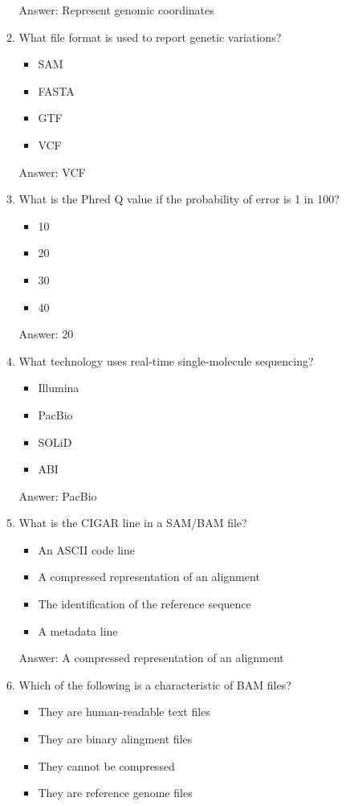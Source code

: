\begin{itemize}
\begin{enumerate}
Answer: Represent genomic coordinates

\item What file format is used to report genetic variations?
\begin{itemize}
\item SAM
\item FASTA
\item GTF
\item VCF
\end{itemize}

Answer: VCF

\item What is the Phred Q value if the probability of error is 1 in 100?
\begin{itemize}
\item 10
\item 20
\item 30
\item 40
\end{itemize}

Answer: 20

\item What technology uses real-time single-molecule sequencing?
\begin{itemize}
\item Illumina
\item PacBio
\item SOLiD
\item ABI
\end{itemize}

Answer: PacBio

\item What is the CIGAR line in a SAM/BAM file?
\begin{itemize}
\item An ASCII code line
\item A compressed representation of an alignment
\item The identification of the reference sequence
\item A metadata line
\end{itemize}

Answer: A compressed representation of an alignment

\item Which of the following is a characteristic of BAM files?
\begin{itemize}
\item They are human-readable text files
\item They are binary alingment files
\item They cannot be compressed
\item They are reference genome files
\end{itemize}


\end{enumerate}
\end{itemize}
